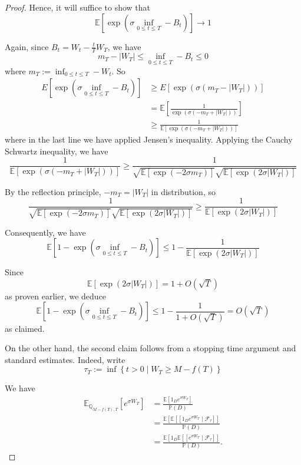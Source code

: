 \documentclass{article}
\theoremstyle{definition}
\theoremstyle{definition}
\begin{document}
\begin{proof}
Hence, it will suffice to show that
$$
\mathbb{E}\left[\exp \left(\sigma \inf _{0 \leq t \leq T}-B_{t}\right)\right] \rightarrow 1
$$

Again, since $B_{t}=W_{t}-\frac{t}{T} W_{T}$, we have
$$
m_{T}-\left|W_{T}\right| \leq \inf _{0 \leq t \leq T}-B_{t} \leq 0
$$
where $m_{T}:=\inf _{0 \leq t \leq T}-W_{t}$. So
$$
\begin{aligned}
E\left[\exp \left(\sigma \inf _{0 \leq t \leq T}-B_{t}\right)\right] & \geq E\left[\exp \left(\sigma\left(m_{T}-\left|W_{T}\right|\right)\right)\right] \\
& =\mathbb{E}\left[\frac{1}{\exp \left(\sigma\left(-m_{T}+\left|W_{T}\right|\right)\right)}\right] \\
& \geq \frac{1}{\mathbb{E}\left[\exp \left(\sigma\left(-m_{T}+\left|W_{T}\right|\right)\right)\right]}
\end{aligned}
$$
where in the last line we have applied Jensen's inequality. Applying the Cauchy Schwartz inequality, we have
$$
\frac{1}{\mathbb{E}\left[\exp \left(\sigma\left(-m_{T}+\left|W_{T}\right|\right)\right)\right]} \geq \frac{1}{\sqrt{\mathbb{E}\left[\exp \left(-2 \sigma m_{T}\right)\right]} \sqrt{\mathbb{E}\left[\exp \left(2 \sigma\left|W_{T}\right|\right)\right]}}
$$

By the reflection principle, $-m_{T}=\left|W_{T}\right|$ in distribution, so
$$
\frac{1}{\sqrt{\mathbb{E}\left[\exp \left(-2 \sigma m_{T}\right)\right]} \sqrt{\mathbb{E}\left[\exp \left(2 \sigma\left|W_{T}\right|\right)\right]}} \geq \frac{1}{\mathbb{E}\left[\exp \left(2 \sigma\left|W_{T}\right|\right)\right]}
$$

Consequently, we have
$$
\mathbb{E}\left[1-\exp \left(\sigma \inf _{0 \leq t \leq T}-B_{t}\right)\right] \leq 1-\frac{1}{\mathbb{E}\left[\exp \left(2 \sigma\left|W_{T}\right|\right)\right]}
$$

Since
$$
\mathbb{E}\left[\exp \left(2 \sigma\left|W_{T}\right|\right)\right]=1+O(\sqrt{T})
$$
as proven earlier, we deduce
$$
\mathbb{E}\left[1-\exp \left(\sigma \inf _{0 \leq t \leq T}-B_{t}\right)\right] \leq 1-\frac{1}{1+O(\sqrt{T})}=O(\sqrt{T})
$$
as claimed.

On the other hand, the second claim follows from a stopping time argument and standard estimates. Indeed, write
$$
\tau_{T}:=\inf \left\{t>0 \mid W_{T} \geq M-f(T)\right\}
$$

We have
$$
\begin{aligned}
\mathbb{E}_{\mathbb{Q}_{M-f(T), T}}\left[e^{\sigma W_{T}}\right] & =\frac{\mathbb{E}\left[1_{D} e^{\sigma W_{T}}\right]}{\mathbb{P}(D)} \\
& =\frac{\mathbb{E}\left[\mathbb{E}\left[\left[1_{D} e^{\sigma W_{T}} \mid \mathcal{F}_{\tau}\right]\right]\right.}{\mathbb{P}(D)} \\
& =\frac{\mathbb{E}\left[1_{D} \mathbb{E}\left[\left[e^{\sigma W_{T}} \mid \mathcal{F}_{\tau}\right]\right]\right.}{\mathbb{P}(D)} .
\end{aligned}
$$


\end{proof}
\end{document}
